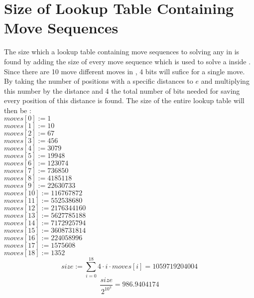 \chapter{Size of Lookup Table Containing Move Sequences}
\label{chap:sizeOfLookup}
\emptyTop{}
The size which a lookup table containing move sequences to solving any \cube{} in  is found by adding the size of every move sequence which is used to solve a \cube{} inside .
Since there are 10 move different moves in , 4 bits will sufice for a single move.
By taking the number of positions with a specific distances to $e$ and multiplying this number by the distance and 4 the total number of bits needed for saving every position of this distance is found.
The size of the entire lookup table will then be \cite{rokicki09}: \\
$moves[0] := 1$ \\
$moves[1] := 10$ \\
$moves[2] := 67$ \\
$moves[3] := 456$ \\
$moves[4] := 3079$ \\
$moves[5] := 19948$ \\
$moves[6] := 123074$ \\
$moves[7] := 736850$ \\
$moves[8] := 4185118$ \\
$moves[9] := 22630733$ \\
$moves[10] := 116767872$ \\
$moves[11] := 552538680$ \\
$moves[12] := 2176344160$ \\
$moves[13] := 5627785188$ \\
$moves[14] := 7172925794$ \\
$moves[15] := 3608731814$ \\
$moves[16] := 224058996$ \\
$moves[17] := 1575608$ \\
$moves[18] := 1352$ \\
\[ size := \sum_{i=0}^{18} 4 \cdot i \cdot moves[i] = 1059719204004\]
\[ \frac{size}{2^{10^3}} = 986.9404174 \]

